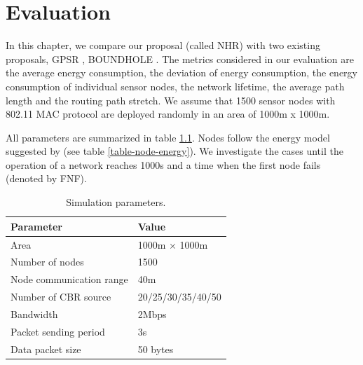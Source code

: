 \chapter{Evaluation}\label{chapter7}
In this chapter, we compare our proposal (called NHR) with two existing proposals, GPSR \cite{gpsr}, BOUNDHOLE \cite{boundhole}. The metrics considered in our evaluation are the average energy consumption, the deviation of energy consumption, the energy consumption of individual sensor nodes, the network lifetime, the average path length and the routing path stretch. We assume that 1500 sensor nodes with 802.11 MAC protocol are deployed randomly in an area of 1000m x 1000m.

All parameters are summarized in table \ref{table-node-config}. Nodes follow the energy model suggested by \cite{energymodel} (see table \ref{table-node-energy}). We investigate the cases until the operation of a network reaches 1000s and a time when the first node fails (denoted by FNF).

\begin{table}[!htb]
\centering
\caption{Simulation parameters.}
\label{table-node-config}
\begin{tabular}{|l|l|}
\hline
Parameter                & Value              \\ \hline
Area                     & 1000m $\times$ 1000m \\ \hline
Number of nodes          & 1500               \\ \hline
Node communication range & 40m                \\ \hline
Number of CBR source     & 20/25/30/35/40/50  \\ \hline
Bandwidth                & 2Mbps              \\ \hline
Packet sending period    & 3s                 \\ \hline
Data packet size         & 50 bytes           \\ \hline
\end{tabular}
\end{table}

